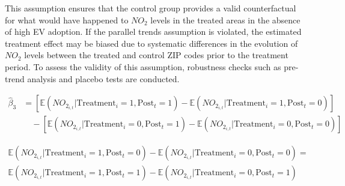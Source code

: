 \documentclass[12pt]{article}
\newcommand\tab[1][.50cm]{\hspace*{#1}}
\begin{document}
\begin{multicols}{2}
		\tab This assumption ensures that the control group provides a valid counterfactual for what would have happened to $NO_2$ levels in the treated areas in the absence of high EV adoption. If the parallel trends assumption is violated, the estimated treatment effect may be biased due to systematic differences in the evolution of $NO_2$ levels between the treated and control ZIP codes prior to the treatment period. To assess the validity of this assumption, robustness checks such as pre-trend analysis and placebo tests are conducted.
	\end{multicols}
	\begin{align}
		\hat{\beta}_3 &= \left[ \mathbb{E}( NO_{2_{i,t}} | \text{Treatment}_{i} = 1, \text{Post}_{t} = 1 ) 
		- \mathbb{E}( NO_{2_{i,t}} | \text{Treatment}_{i} = 1, \text{Post}_{t} = 0 ) \right] \nonumber \\
		&\quad - \left[ \mathbb{E}( NO_{2_{i,t}} | \text{Treatment}_{i} = 0, \text{Post}_{t} = 1 ) 
		- \mathbb{E}( NO_{2_{i,t}} | \text{Treatment}_{i} = 0, \text{Post}_{t} = 0 ) \right] \label{eq:DiD_estimator}
	\end{align}
	
	\begin{align}
		\mathbb{E}( NO_{2_{i,t}} | \text{Treatment}_{i} = 1, \text{Post}_{t} = 0 ) - 
		\mathbb{E}( NO_{2_{i,t}} | \text{Treatment}_{i} = 0, \text{Post}_{t} = 0 ) = \nonumber \\
		\mathbb{E}( NO_{2_{i,t}} | \text{Treatment}_{i} = 1, \text{Post}_{t} = 1 ) - 
		\mathbb{E}( NO_{2_{i,t}} | \text{Treatment}_{i} = 0, \text{Post}_{t} = 1 )  \label{eqn:par}
	\end{align}
	
\end{document}
